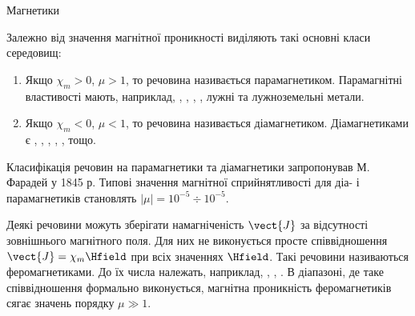 \documentclass[onlytextwidth]{beamer}
\begin{document}
\begin{frame}{Магнетики}{}\small
	\begin{block}{}\justifying
		Залежно від значення магнітної проникності виділяють такі основні класи середовищ:
		\begin{enumerate}
			\item Якщо $\chi_m > 0$, $\mu > 1$, то речовина називається \alert{парамагнетиком}. Парамагнітні властивості мають, наприклад,
			      \href{https://en.wikipedia.org/wiki/Aluminium}{},
			      \href{https://en.wikipedia.org/wiki/Platinum}{},
			      \href{https://en.wikipedia.org/wiki/Iron(II)\_chloride}{},
			      \href{https://en.wikipedia.org/wiki/Oxygen}{},
			      лужні та лужноземельні метали.

			\item Якщо $\chi_m < 0$, $\mu < 1$, то речовина називається \alert{діамагнетиком}. Діамагнетиками  є
			      \href{https://en.wikipedia.org/wiki/Bismuth}{},
			      \href{https://en.wikipedia.org/wiki/Antimony}{},
			      \href{https://en.wikipedia.org/wiki/Silicon}{},
			      \href{https://en.wikipedia.org/wiki/Water}{},
			      \href{https://en.wikipedia.org/wiki/Dihydrogen}{},
			      \href{https://en.wikipedia.org/wiki/Nitrogen}{} тощо.
		\end{enumerate}
		Класифікація речовин на парамагнетики та діамагнетики запропонував М. Фарадей у 1845 р. Типові значення магнітної сприйнятливості для діа- і
		парамагнетиків становлять $|\mu| = 10^{-5} \div 10^{-5}$.
	\end{block}
	\vspace*{-1em}
	\begin{block}{}\justifying\footnotesize
		Деякі речовини можуть зберігати намагніченість $\vect{J}$ за відсутності зовнішнього магнітного поля. Для них не виконується просте співвідношення
		$\vect{J} = \chi_m\Hfield$ при всіх значеннях $\Hfield$. Такі речовини називаються \alert{феромагнетиками}. До їх числа належать, наприклад, ,
		, . В діапазоні, де таке співвідношення формально виконується, магнітна проникність феромагнетиків сягає значень порядку $\mu
			\gg 1$.
	\end{block}
\end{frame}
\end{document}
